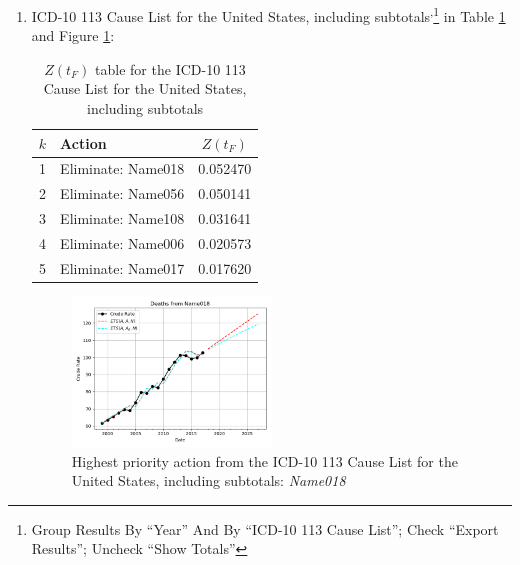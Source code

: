 \documentclass[12pt, a4paper, twocolumn]{article}
\begin{document}
\begin{enumerate}
  \vfill\eject
  \item ICD-10 113 Cause List for the United States, including subtotals\cite{centers2017underlying}\textsuperscript{,}\footnote{Group Results By \enquote{Year} And By \enquote{ICD-10 113 Cause List}; Check \enquote{Export Results}; Uncheck \enquote{Show Totals}} in Table \ref{table:ztable2} and Figure \ref{fig:k2}:
    \begin{table}[H]
      \centering
      \begin{tabular}{clc}
        \toprule
          $k$ & Action             & $Z(t_F)$ \\
        \midrule
          1   & Eliminate: Name018 & 0.052470 \\
          2   & Eliminate: Name056 & 0.050141 \\
          3   & Eliminate: Name108 & 0.031641 \\
          4   & Eliminate: Name006 & 0.020573 \\
          5   & Eliminate: Name017 & 0.017620 \\
        \bottomrule
      \end{tabular}
      \caption{$Z(t_F)$ table for the ICD-10 113 Cause List for the United States, including subtotals}
      \label{table:ztable2}
    \end{table}
    \begin{figure}[H]
      \centering
      \includegraphics[width=0.5\textwidth]{results/US_ICD10_113_SELECTED_CAUSES_ALL/Name018_ets.png}
      \caption{Highest priority action from the ICD-10 113 Cause List for the United States, including subtotals: \textit{Name018}}\label{fig:k2}
    \end{figure}


\end{enumerate}
\end{document}
